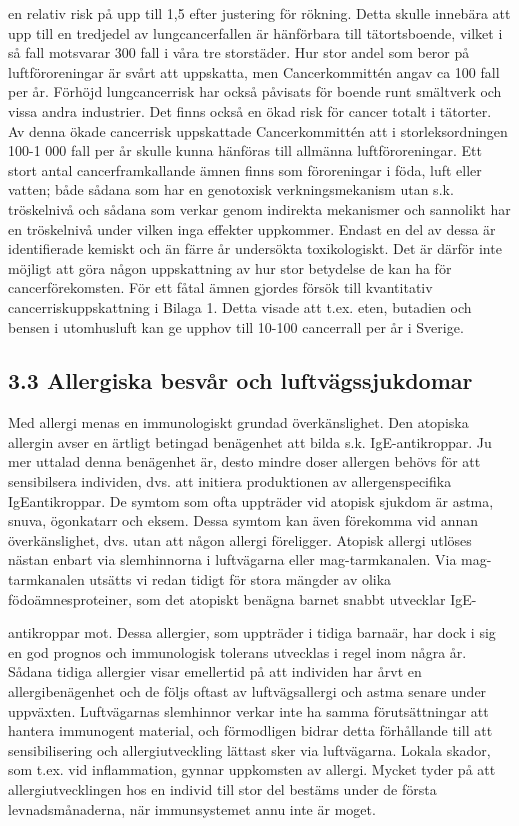 en relativ risk på upp till 1,5 efter justering för rökning. Detta skulle innebära att upp till en tredjedel av lungcancerfallen är hänförbara till tätortsboende, vilket i så fall motsvarar 300 fall i våra tre storstäder. Hur stor andel som beror på luftföroreningar är svårt att uppskatta, men Cancerkommittén angav ca 100 fall per år. Förhöjd lungcancerrisk har också påvisats för boende runt smältverk och vissa andra industrier.
Det finns också en ökad risk för cancer totalt i tätorter. Av denna ökade cancerrisk uppskattade Cancerkommittén att i storleksordningen 100-1 000 fall per år skulle kunna hänföras till allmänna luftföroreningar.
Ett stort antal cancerframkallande ämnen finns som föroreningar i föda, luft eller vatten; både sådana som har en genotoxisk verkningsmekanism utan s.k. tröskelnivå och sådana som verkar genom indirekta mekanismer och sannolikt har en tröskelnivå under vilken inga effekter uppkommer. Endast en del av dessa är identifierade kemiskt och än färre år undersökta toxikologiskt. Det är därför inte möjligt att göra någon uppskattning av hur stor betydelse de kan ha för cancerförekomsten. För ett fåtal ämnen gjordes försök till kvantitativ cancerriskuppskattning i Bilaga 1. Detta visade att t.ex. eten, butadien och bensen i utomhusluft kan ge upphov till 10-100 cancerrall per år i Sverige.
\subsection*{3.3 Allergiska besvår och luftvägssjukdomar}
Med allergi menas en immunologiskt grundad överkänslighet. Den atopiska allergin avser en ärtligt betingad benägenhet att bilda s.k. IgE-antikroppar. Ju mer uttalad denna benägenhet är, desto mindre doser allergen behövs för att sensibilsera individen, dvs. att initiera produktionen av allergenspecifika IgEantikroppar. De symtom som ofta uppträder vid atopisk sjukdom är astma, snuva, ögonkatarr och eksem. Dessa symtom kan även förekomma vid annan överkänslighet, dvs. utan att någon allergi föreligger.
Atopisk allergi utlöses nästan enbart via slemhinnorna i luftvägarna eller mag-tarmkanalen. Via mag-tarmkanalen utsätts vi redan tidigt för stora mängder av olika födoämnesproteiner, som det atopiskt benägna barnet snabbt utvecklar IgE-

antikroppar mot. Dessa allergier, som uppträder i tidiga barnaär, har dock i sig en god prognos och immunologisk tolerans utvecklas i regel inom några år. Sådana tidiga allergier visar emellertid på att individen har årvt en allergibenägenhet och de följs oftast av luftvägsallergi och astma senare under uppväxten. Luftvägarnas slemhinnor verkar inte ha samma förutsättningar att hantera immunogent material, och förmodligen bidrar detta förhållande till att sensibilisering och allergiutveckling lättast sker via luftvägarna. Lokala skador, som t.ex. vid inflammation, gynnar uppkomsten av allergi.
Mycket tyder på att allergiutvecklingen hos en individ till stor del bestäms under de första levnadsmånaderna, när immunsystemet annu inte är moget.
